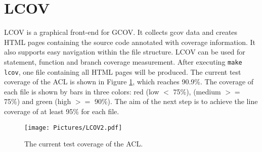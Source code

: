 \section{LCOV}
LCOV is a graphical front-end for GCOV. It collects gcov data and creates HTML pages containing the source code annotated with coverage information. It also supports easy navigation within the file structure. LCOV can be used for statement, function and branch coverage measurement.
After executing \lstinline[style=BashInputStyle]´make lcov´, 
one file containing all HTML pages will be produced. The current test coverage of the ACL is shown in Figure \ref{LCOVS}, which reaches 90.9\%. The coverage of each file is shown by bars in three colors: red (low $<$ 75\%), (medium $>=$ 75\%) and green (high $>=$ 90\%). The aim of the next step is to achieve the line coverage of at least 95\% for each file.

\begin{figure}[h]
  \texttt{[image: Pictures/LCOV2.pdf]} 
  \caption{The current test coverage of the ACL.}\label{LCOVS}
\end{figure}
